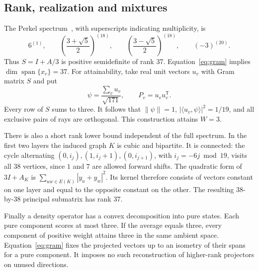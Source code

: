 \documentclass[11pt]{article}
\newcommand{\ip}[2]{\langle #1,#2\rangle}
\begin{document}
\subsection{Rank, realization and mixtures}
The Perkel spectrum~\cite{brouwer}, with superscripts indicating multiplicity, is
\begin{equation}
 6^{(1)},\qquad \left(\frac{3+\sqrt5}{2}\right)^{(18)},\qquad
 \left(\frac{3-\sqrt5}{2}\right)^{(18)},\qquad (-3)^{(20)}. \label{eq:spectrum}
\end{equation}
Thus $S=I+A/3$ is positive semidefinite of rank 37. Equation~\eqref{eq:gram} implies $\dim\operatorname{span}\{x_v\}=37$. For attainability, take real unit vectors $u_v$ with Gram matrix $S$ and put
\[
          \psi=\frac{\sum_v u_v}{\sqrt{171}},\qquad
          P_v=u_vu_v^{\mathsf T}.
\]
Every row of $S$ sums to three. It follows that $\|\psi\|=1$, $|\ip{u_v}{\psi}|^2=1/19$, and all exclusive pairs of rays are orthogonal. This construction attains $W=3$.

There is also a short rank lower bound independent of the full spectrum. In the first two layers the induced graph $K$ is cubic and bipartite. It is connected: the cycle alternating $(0,i_j),(1,i_j+1),(0,i_{j+1})$, with $i_j=-6j\bmod19$, visits all 38 vertices, since $1$ and $7$ are allowed forward shifts. The quadratic form of $3I+A_K$ is $\sum_{uw\in E(K)}|y_u+y_w|^2$. Its kernel therefore consists of vectors constant on one layer and equal to the opposite constant on the other. The resulting $38$-by-$38$ principal submatrix has rank 37.

Finally a density operator has a convex decomposition into pure states. Each pure component scores at most three. If the average equals three, every component of positive weight attains three in the same ambient space. Equation~\eqref{eq:gram} fixes the projected vectors up to an isometry of their spans for a pure component. It imposes no such reconstruction of higher-rank projectors on unused directions.
\end{document}
